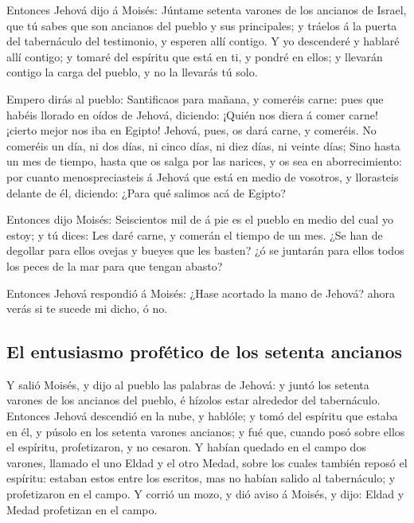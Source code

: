  Entonces Jehová dijo á Moisés: Júntame setenta varones de
los ancianos de Israel, que tú sabes que son ancianos del pueblo y sus
principales; y tráelos á la puerta del tabernáculo del testimonio, y
esperen allí contigo.  Y yo descenderé y hablaré allí
contigo; y tomaré del espíritu que está en ti, y pondré en ellos; y
llevarán contigo la carga del pueblo, y no la llevarás tú solo.

 Empero dirás al pueblo: Santificaos para mañana, y
comeréis carne: pues que habéis llorado en oídos de Jehová, diciendo:
¡Quién nos diera á comer carne! ¡cierto mejor nos iba en Egipto! Jehová,
pues, os dará carne, y comeréis.  No comeréis un día, ni
dos días, ni cinco días, ni diez días, ni veinte días; 
Sino hasta un mes de tiempo, hasta que os salga por las narices, y os
sea en aborrecimiento: por cuanto menospreciasteis á Jehová que está en
medio de vosotros, y llorasteis delante de él, diciendo: ¿Para qué
salimos acá de Egipto?

 Entonces dijo Moisés: Seiscientos mil de á pie es el
pueblo en medio del cual yo estoy; y tú dices: Les daré carne, y comerán
el tiempo de un mes.  ¿Se han de degollar para ellos ovejas
y bueyes que les basten? ¿ó se juntarán para ellos todos los peces de la
mar para que tengan abasto?

 Entonces Jehová respondió á Moisés: ¿Hase acortado la mano
de Jehová? ahora verás si te sucede mi dicho, ó no.

\hypertarget{el-entusiasmo-profuxe9tico-de-los-setenta-ancianos}{%
\subsection{El entusiasmo profético de los setenta
ancianos}\label{el-entusiasmo-profuxe9tico-de-los-setenta-ancianos}}

 Y salió Moisés, y dijo al pueblo las palabras de Jehová: y
juntó los setenta varones de los ancianos del pueblo, é hízolos estar
alrededor del tabernáculo.  Entonces Jehová descendió en la
nube, y hablóle; y tomó del espíritu que estaba en él, y púsolo en los
setenta varones ancianos; y fué que, cuando posó sobre ellos el
espíritu, profetizaron, y no cesaron.  Y habían quedado en
el campo dos varones, llamado el uno Eldad y el otro Medad, sobre los
cuales también reposó el espíritu: estaban estos entre los escritos, mas
no habían salido al tabernáculo; y profetizaron en el campo.
 Y corrió un mozo, y dió aviso á Moisés, y dijo: Eldad y
Medad profetizan en el campo.

